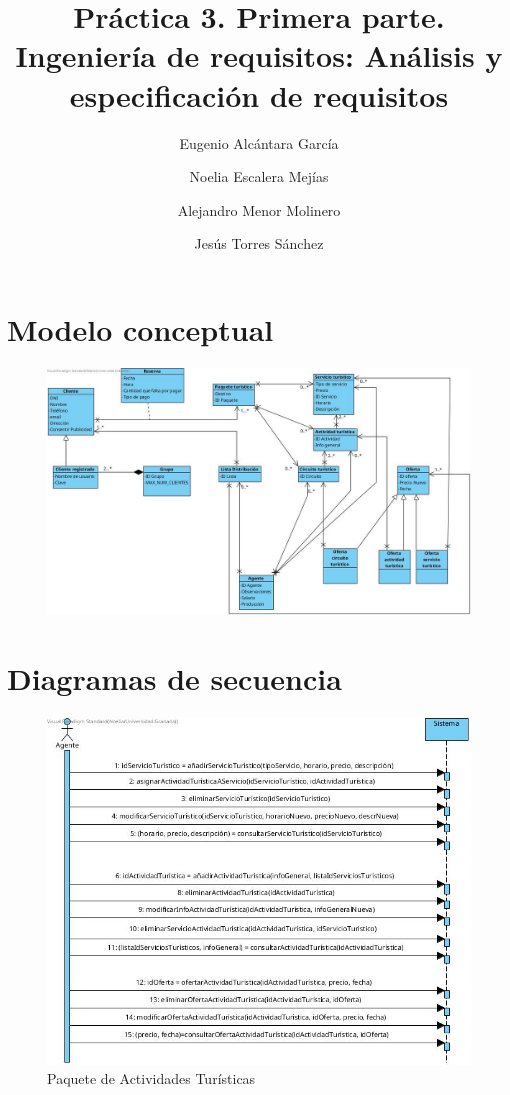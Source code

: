 \documentclass{article}
\title{Práctica 3. Primera parte. Ingeniería de requisitos: Análisis y especificación de requisitos}
\author{Eugenio Alcántara García\\
	\and Noelia Escalera Mejías\\
	\and Alejandro Menor Molinero\\
	\and Jesús Torres Sánchez}
\begin{document}
	\maketitle
	
	\section{Modelo conceptual}
	
	\begin{figure}[H]
		\centering
		\includegraphics[totalheight=9cm]{Modelo_conceptual}
	\end{figure}
	\newpage
	\section{Diagramas de secuencia}
	\begin{figure}[H]
		\centering
		\includegraphics[totalheight=12cm]{Paquete_1}
		\caption{Paquete de Actividades Turísticas}
		\label{fig:p1}
	\end{figure}
\end{document}
